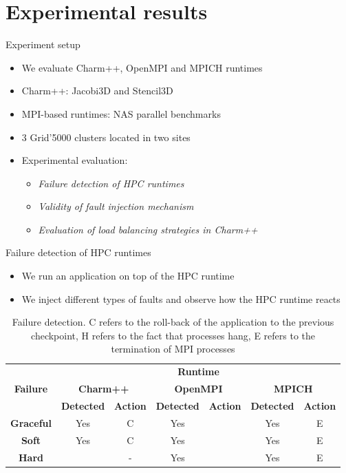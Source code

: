 \documentclass[11pt,xcolor=dvipsnames,presentation]{beamer}
\begin{document}
\section{Experimental results}
\label{sec-3}
\begin{frame}[label=sec-3-0-1]{Experiment setup}
\begin{itemize}
\item We evaluate Charm++, OpenMPI and MPICH runtimes
\item Charm++: Jacobi3D and Stencil3D
\item MPI-based runtimes:  NAS parallel benchmarks

\item 3 Grid'5000 clusters located in two sites

\item Experimental evaluation:
\begin{itemize}
\item \emph{Failure detection of HPC runtimes}
\item \emph{Validity of fault injection mechanism}
\item \emph{Evaluation of load balancing strategies in Charm++}
\end{itemize}
\end{itemize}
\end{frame}

\begin{frame}[label=sec-3-0-2]{Failure detection of HPC runtimes}
\begin{itemize}
\item We run an application on top of the HPC runtime
\item We inject different types of faults and observe how the HPC runtime reacts
\end{itemize}


\begin{table}[ht!]
  { \scriptsize
  \begin{tabular}{|c|c|c|c|c|c|c|}
  \hline
  \multirow{3}{*}{\textbf{Failure}} &
  \multicolumn{6}{c|}{\textbf{Runtime}}  \\
  \cline{1-7}
  &\multicolumn{2}{c}{\textbf{Charm++}}&
  \multicolumn{2}{|c}{\textbf{OpenMPI}}&
  \multicolumn{2}{|c|}{\textbf{MPICH}}\\
  \cline{2-7}
  &\textbf{Detected} & \textbf{Action} & \textbf{Detected} & \textbf{Action} & \textbf{Detected} & \textbf{Action}  \\
  \hline
  \textbf{Graceful}  &   Yes  & C   &  Yes   &  \color{red}{H}  &  Yes   &  E   \\
  \textbf{Soft}  &       Yes  & C   &  Yes   &  \color{red}{H}  &  Yes   &  E   \\
  \textbf{Hard}   &      \color{red}{No}   & -   &  Yes   &  \color{red}{H}  &  Yes   &  E   \\
  \hline
  \end{tabular}
  }
  \caption{Failure detection. C refers to the roll-back of the application to the previous checkpoint,
  H refers to the fact that processes hang, E refers to the termination of MPI processes}
  \label{table:assess_HPC_runtimes}
\end{table}
\end{frame}
\end{document}
